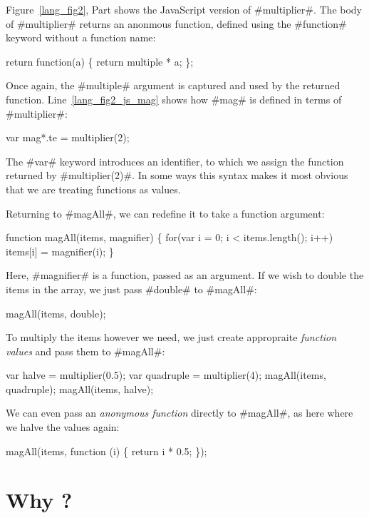 \documentclass[12pt]{report}
\begin{document}
Figure~\ref{lang_fig2}, Part  shows the JavaScript
version of #multiplier#. The body of #multiplier# returns an anonmous
function, defined using the #function# keyword without a function name:
\begin{AVerb}
  return function(a) \{ 
    return multiple * a;
  \};
\end{AVerb}

Once again, the #multiple# argument is captured and used by the
returned function. Line~\ref{lang_fig2_js_mag} shows how #mag#
is defined in terms of #multiplier#:

\begin{AVerb}
  var mag*.te = multiplier(2);
\end{AVerb}

The #var# keyword introduces an
identifier, to which we assign the function returned by
#multiplier(2)#. In some ways this syntax makes it most obvious that
we are treating functions as values.

Returning to #magAll#, we can redefine it to take a function argument:
\begin{AVerb}
function magAll(items, magnifier) \{
  for(var i = 0; i < items.length(); i++)
    items[i] = magnifier(i);
\}
\end{AVerb}
Here, #magnifier# is a function, passed as an argument. If 
we wish to double the items in the array, we just pass #double#
to #magAll#:
\begin{AVerb}
  magAll(items, double);
\end{AVerb}
To multiply the items however we need, we just create appropraite
\emph{function values} and pass them to #magAll#:
\begin{AVerb}
  var halve = multiplier(0.5);
  var quadruple = multiplier(4);
  magAll(items, quadruple);
  magAll(items, halve);
\end{AVerb}
We can even pass an \emph{anonymous function} directly to 
#magAll#, as here where we halve the values again:
\begin{AVerb}
  magAll(items, function (i) \{ return i * 0.5; \});
\end{AVerb}


\section{Why \LamA?}
\label{lang_sec1_}
\end{document}
